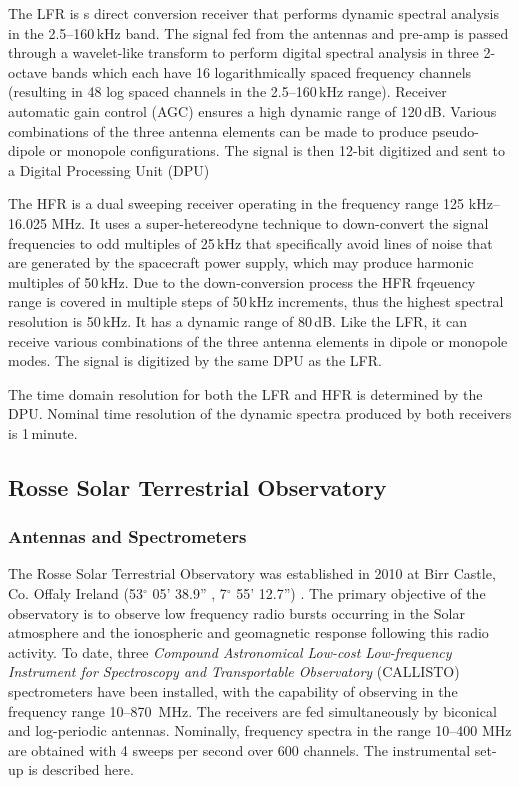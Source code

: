 The LFR is s direct conversion receiver that performs dynamic spectral analysis in the 2.5--160\,kHz band. The signal fed from the antennas and pre-amp is passed through a wavelet-like transform to perform digital spectral analysis in three 2-octave bands which each have 16 logarithmically spaced frequency channels (resulting in 48 log spaced channels in the 2.5--160\,kHz range). Receiver automatic gain control (AGC) ensures a high dynamic range of 120\,dB. Various combinations of the three antenna elements can be made to produce pseudo-dipole or monopole configurations. The signal is then 12-bit digitized and sent to a Digital Processing Unit (DPU)

The HFR is a dual sweeping receiver operating in the frequency range 125 kHz--16.025 MHz. It uses a super-hetereodyne technique to down-convert the signal frequencies to odd multiples of 25\,kHz that specifically avoid lines of noise that are generated by the spacecraft power supply, which may produce harmonic multiples of 50\,kHz. Due to the down-conversion process the HFR frqeuency range is covered in multiple steps of 50\,kHz increments, thus the highest spectral resolution is 50\,kHz. It has a dynamic range of 80\,dB. Like the LFR, it can receive various combinations of the three antenna elements in dipole or monopole modes. The signal is digitized by the same DPU as the LFR.

The time domain resolution for both the LFR and HFR is determined by the DPU. Nominal time resolution of the dynamic spectra produced by both receivers is 1\,minute.

\subsection{Rosse Solar Terrestrial Observatory}\label{sec:30}

\subsubsection{Antennas and Spectrometers}
The Rosse Solar Terrestrial Observatory was established in 2010 at Birr Castle, Co. Offaly Ireland (53$^{\circ}$ 05' 38.9'' , 7$^{\circ}$ 55' 12.7'') \citep{zucca2012}. The primary objective of the observatory is to observe low frequency radio bursts occurring in the Solar atmosphere and the ionospheric and geomagnetic response following this radio activity.  To date, three \textit{Compound Astronomical Low-cost Low-frequency Instrument for Spectroscopy and Transportable Observatory} (CALLISTO) spectrometers have been installed, with the capability of observing in the frequency range 10--870~MHz. The receivers are fed simultaneously by biconical and log-periodic antennas. Nominally, frequency spectra in the range 10--400 MHz are obtained with 4 sweeps per second over 600 channels. The instrumental set-up is described here.

